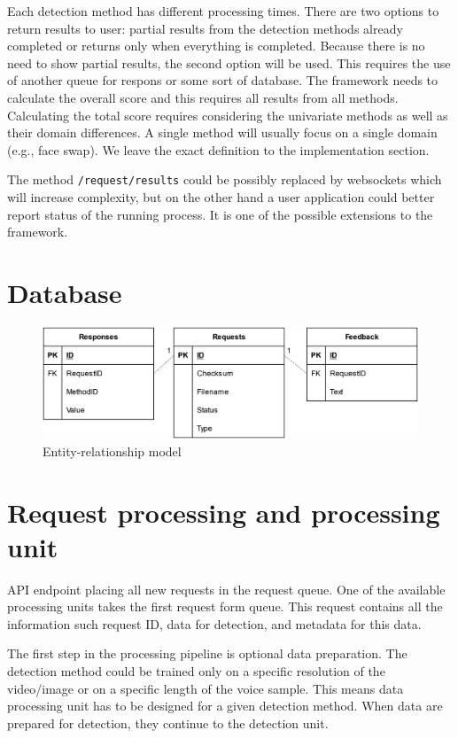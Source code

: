 Each detection method has different processing times. There are two options to return results to user: partial results from the detection methods already completed or returns only when everything is completed. Because there is no need to show partial results, the second option will be used. This requires the use of another queue for respons or some sort of database. The framework needs to calculate the overall score and this requires all results from all methods. Calculating the total score requires considering the univariate methods as well as their domain differences. A single method will usually focus on a single domain (e.g., face swap). We leave the exact definition to the implementation section.

The method \texttt{/request/results} could be possibly replaced by websockets which will increase complexity, but on the other hand a user application could better report status of the running process. It is one of the possible extensions to the framework.

\section{Database}
\begin{figure}[H]
    \centering
    \includegraphics[width=.725\linewidth]{other-fig/framework_architecture_database.png}
    \caption{Entity-relationship model}
\label{fig:framework_architecture_database}
\end{figure}

\section{Request processing and processing unit}

API endpoint placing all new requests in the request queue. One of the available processing units takes the first request form queue. This request contains all the information such request ID, data for detection, and metadata for this data.

The first step in the processing pipeline is optional data preparation. The detection method could be trained only on a specific resolution of the video/image or on a specific length of the voice sample. This means data processing unit has to be designed for a given detection method. When data are prepared for detection, they continue to the detection unit.

